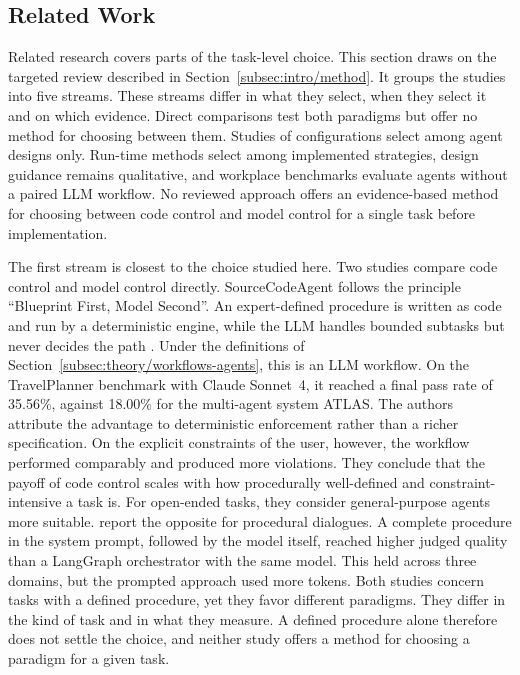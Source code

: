 \subsection{Related Work}
\label{subsec:theory/related-work}
Related research covers parts of the task-level choice. This section draws on the targeted review described in Section~\ref{subsec:intro/method}. It groups the studies into five streams. These streams differ in what they select, when they select it and on which evidence. Direct comparisons test both paradigms but offer no method for choosing between them. Studies of configurations select among agent designs only. Run-time methods select among implemented strategies, design guidance remains qualitative, and workplace benchmarks evaluate agents without a paired LLM workflow. No reviewed approach offers an evidence-based method for choosing between code control and model control for a single task before implementation.
 
The first stream is closest to the choice studied here. Two studies compare code control and model control directly. SourceCodeAgent follows the principle ``Blueprint First, Model Second''. An expert-defined procedure is written as code and run by a deterministic engine, while the LLM handles bounded subtasks but never decides the path \parencite{qiuBlueprintFirstModel2025}. Under the definitions of Section~\ref{subsec:theory/workflows-agents}, this is an LLM workflow. On the TravelPlanner benchmark with Claude Sonnet~4, it reached a final pass rate of 35.56\%, against 18.00\% for the multi-agent system ATLAS. The authors attribute the advantage to deterministic enforcement rather than a richer specification. On the explicit constraints of the user, however, the workflow performed comparably and produced more violations. They conclude that the payoff of code control scales with how procedurally well-defined and constraint-intensive a task is. For open-ended tasks, they consider general-purpose agents more suitable. \textcite{dennisInContextPromptingObsoletes2026} report the opposite for procedural dialogues. A complete procedure in the system prompt, followed by the model itself, reached higher judged quality than a LangGraph orchestrator with the same model. This held across three domains, but the prompted approach used more tokens. Both studies concern tasks with a defined procedure, yet they favor different paradigms. They differ in the kind of task and in what they measure. A defined procedure alone therefore does not settle the choice, and neither study offers a method for choosing a paradigm for a given task.
 
